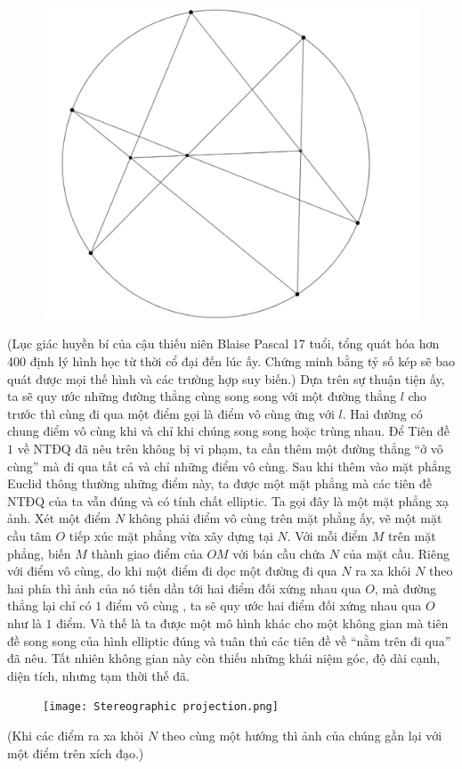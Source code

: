 \begin{figure}[ht]
\includegraphics[width=\textwidth]{Pascal_theorem.png}
\end{figure}
\caption: 
(Lục giác huyền bí của cậu thiếu niên Blaise Pascal 17 tuổi, tổng quát hóa hơn 400 định lý hình học từ thời cổ đại đến lúc ấy. Chứng minh bằng tỷ số kép sẽ bao quát được mọi thế hình và các trường hợp suy biến.)	
		\vskip 0.1cm
	Dựa trên sự thuận tiện ấy, ta sẽ quy ước những đường thẳng cùng song song với một đường thẳng $l$ cho trước thì cùng đi qua một điểm gọi là điểm vô cùng ứng với $l$. Hai đường có chung điểm vô cùng khi và chỉ khi chúng song song hoặc trùng nhau. Để Tiên đề $1$ về NTĐQ đã nêu trên không bị vi phạm, ta cần thêm một đường thẳng ``ở vô cùng'' mà đi qua tất cả và chỉ những điểm vô cùng. Sau khi thêm vào mặt phẳng Euclid thông thường những điểm này, ta được một mặt phẳng mà các tiên đề NTĐQ của ta vẫn đúng và có tính chất elliptic. Ta gọi đây là một mặt phẳng xạ ảnh.
	\vskip 0.1cm
	Xét một điểm $N$ không phải điểm vô cùng trên mặt phẳng ấy, vẽ một mặt cầu tâm $O$ tiếp xúc mặt phẳng vừa xây dựng tại $N$. Với mỗi điểm $M$ trên mặt phẳng, biến $M$ thành giao điểm của $OM$ với bán cầu chứa $N$ của mặt cầu. Riêng với điểm vô cùng, do khi một điểm đi dọc một đường đi qua $N$ ra xa khỏi $N$ theo hai phía thì ảnh của nó tiến dần tới hai điểm đối xứng nhau qua $O$, mà đường thẳng lại chỉ có $1$ điểm vô cùng , ta sẽ quy ước hai điểm đối xứng nhau qua $O$ như là $1$ điểm. Và thế là ta được một mô hình khác cho một không gian mà tiên đề song song của hình elliptic đúng và tuân thủ các tiên đề về ``nằm trên đi qua'' đã nêu. Tất nhiên không gian này còn thiếu những khái niệm góc, độ dài cạnh, diện tích, nhưng tạm thời thế đã.
	\begin{figure}[H]
		\vspace*{-5pt}
		\centering
		\captionsetup{labelformat= empty, justification=centering}
		\texttt{[image: Stereographic projection.png]}
		\vspace*{-10pt}
	\end{figure}
	(Khi các điểm ra xa khỏi $N$ theo cùng một hướng thì ảnh của chúng gần lại với một điểm trên xích đạo.)
	
